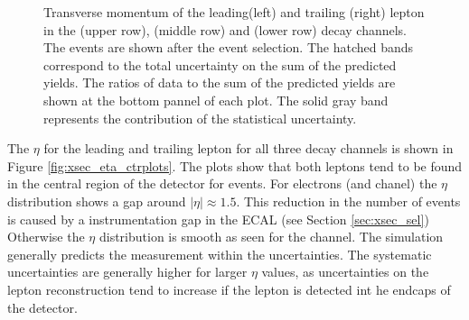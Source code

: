 \begin{figure}[htbp!]
\begin{center}
      \caption{Transverse momentum of the leading(left) and trailing (right)
        lepton in the \emu (upper row), \mumu (middle row) and \ee (lower row) decay channels.
        The events are shown after the
        event selection.  The hatched
        bands correspond to the total uncertainty on the sum of the
        predicted yields. 
        The ratios of data to the sum of the predicted yields are
        shown at the bottom pannel of each plot. The solid gray band
        represents the contribution of the statistical uncertainty.}  
       \label{fig:xsec_pt_ctrplots}
  \end{center}
\end{figure}

The $\eta$ for the leading and trailing lepton for all three decay channels is shown in Figure \ref{fig:xsec_eta_ctrplots}.
The plots show that both leptons tend to be found in the central region of the detector for \ttbar events.
For electrons (\emu and \ee chanel) the $\eta$ distribution shows a gap around $|\eta| \approx 1.5$. This reduction in the number of events is caused by a instrumentation gap in the ECAL (see Section \ref{sec:xsec_sel})
Otherwise the $\eta$ distribution is smooth as seen for the \mumu channel.
The simulation generally predicts the measurement within the uncertainties. The systematic uncertainties are generally higher for larger $\eta$ values, as uncertainties on the lepton reconstruction
tend to increase if the lepton is detected int he endcaps of the detector.


